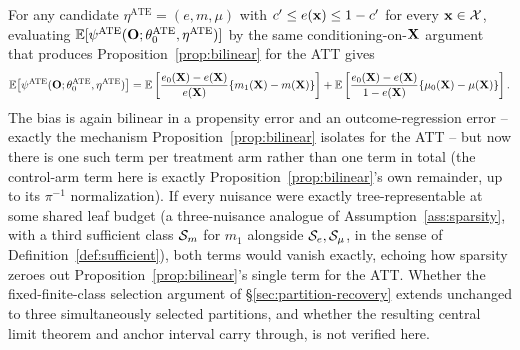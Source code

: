 \documentclass[12pt]{article}
\begin{document}
\begin{remark}
\label{rem:bilinear-ate}
For any candidate $\eta^{\mathrm{ATE}}=(e,m,\mu)$ with $c'\le e(\mathbf{x})\le1-c'$ for every
$\mathbf{x}\in\mathcal{X}$, evaluating $\mathbb{E}[\psi^{\mathrm{ATE}}(\mathbf{O};\theta_0^{\mathrm{ATE}},\eta^{\mathrm{ATE}})]$
by the same conditioning-on-$\mathbf{X}$ argument that produces Proposition~\ref{prop:bilinear} for the
ATT gives
\[
  \mathbb{E}\bigl[\psi^{\mathrm{ATE}}(\mathbf{O};\theta_0^{\mathrm{ATE}},\eta^{\mathrm{ATE}})\bigr]
  =
  \mathbb{E}\left[\frac{e_0(\mathbf{X})-e(\mathbf{X})}{e(\mathbf{X})}\{m_1(\mathbf{X})-m(\mathbf{X})\}\right]
  +
  \mathbb{E}\left[\frac{e_0(\mathbf{X})-e(\mathbf{X})}{1-e(\mathbf{X})}\{\mu_0(\mathbf{X})-\mu(\mathbf{X})\}\right].
\]
The bias is again bilinear in a propensity error and an outcome-regression error -- exactly the
mechanism Proposition~\ref{prop:bilinear} isolates for the ATT -- but now there is one such term
per treatment arm rather than one term in total (the control-arm term here is exactly
Proposition~\ref{prop:bilinear}'s own remainder, up to its $\pi^{-1}$ normalization). If every
nuisance were exactly tree-representable at some shared leaf budget (a three-nuisance analogue of
Assumption~\ref{ass:sparsity}, with a third sufficient class $\mathcal{S}_m$ for $m_1$
alongside $\mathcal{S}_e,\mathcal{S}_\mu$, in the sense of Definition~\ref{def:sufficient}), both terms would
vanish exactly, echoing how sparsity zeroes out Proposition~\ref{prop:bilinear}'s single term for
the ATT. Whether the fixed-finite-class selection argument of \S\ref{sec:partition-recovery}
extends unchanged to three simultaneously selected partitions, and whether the resulting central
limit theorem and anchor interval carry through, is not verified here.
\end{remark}



\end{document}
